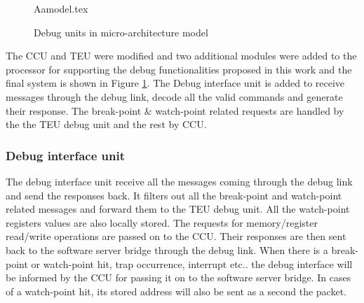 \begin{figure}[h!]
	\centering
	\def\svgwidth{0.8\columnwidth}
	{Aamodel.tex}
	\caption{Debug units in micro-architecture model}
	\label{Aamodel}
\end{figure}

The CCU and TEU were modified and two additional modules were added to the processor for supporting the debug functionalities proposed in this work and the final system is shown in Figure \ref{Aamodel}. The Debug interface unit is added to receive messages through the debug link, decode all the valid commands and generate their response. The break-point \& watch-point related requests are handled by the the TEU debug unit and the rest by CCU.

\subsubsection{Debug interface unit}
The debug interface unit receive all the messages coming through the debug link and send the responses back. It filters out all the break-point and watch-point related messages and forward them to the TEU debug unit. All the watch-point registers values are also locally stored. The requests for memory/register read/write operations are passed on to the CCU. Their responses are then sent back to the software server bridge through the debug link. When there is a break-point or watch-point hit, trap occurrence, interrupt etc.. the debug interface will be informed by the CCU for passing it on to the software server bridge. In cases of a watch-point hit, its stored address will also be sent as a second the packet.

